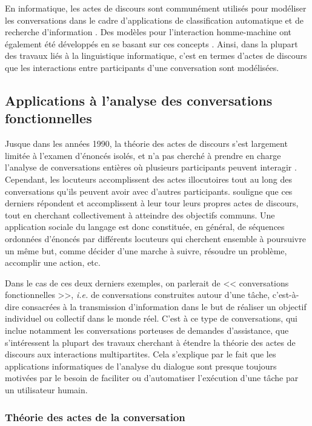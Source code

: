 \documentclass[10pt,a4paper,twoside]{article}
\begin{document}
En informatique, les actes de discours sont communément utilisés pour modéliser les conversations dans le cadre d'applications de classification automatique et de recherche d'information \cite{twitchell2004using}. Des modèles pour l'interaction homme-machine ont également été développés en se basant sur ces concepts \cite{morelli1991computational}. Ainsi, dans la plupart des travaux liés à la linguistique informatique, c’est en termes d’actes de discours que les interactions entre participants d’une conversation sont modélisées.

\subsection{Applications à l'analyse des conversations fonctionnelles}
\label{subsec:applications_in_conversation_analysis}

Jusque dans les années 1990, la théorie des actes de discours s'est largement limitée à l'examen d'énoncés isolés, et n'a pas cherché à prendre en charge l'analyse de conversations entières où plusieurs participants peuvent interagir \cite{vanderveken1994theorie}. Cependant, les locuteurs accomplissent des actes illocutoires tout au long des conversations qu'ils peuvent avoir avec d'autres participants. \citeauthor{vanderveken1994theorie} souligne que ces derniers répondent et accomplissent à leur tour leurs propres actes de discours, tout en cherchant collectivement à atteindre des objectifs communs. Une application sociale du langage est donc constituée, en général, de séquences ordonnées d'énoncés par différents locuteurs qui cherchent ensemble à poursuivre un même but, comme décider d'une marche à suivre, résoudre un problème, accomplir une action, etc.

Dans le cas de ces deux derniers exemples, on parlerait de << conversations fonctionnelles >>, \textit{i.e.} de conversations construites autour d'une tâche, c'est-à-dire consacrées à la transmission d'information dans le but de réaliser un objectif individuel ou collectif dans le monde réel. C'est à ce type de conversations, qui inclue notamment les conversations porteuses de demandes d'assistance, que s'intéressent la plupart des travaux cherchant à étendre la théorie des actes de discours aux interactions multipartites. Cela s'explique par le fait que les applications informatiques de l'analyse du dialogue sont presque toujours motivées par le besoin de faciliter ou d'automatiser l'exécution d'une tâche par un utilisateur humain.

\subsubsection{Théorie des actes de la conversation}
\end{document}
